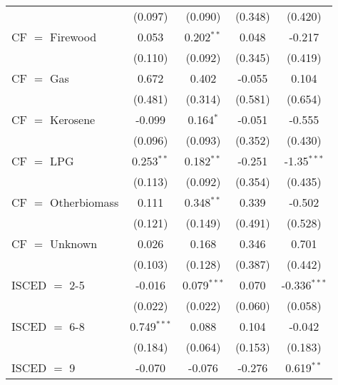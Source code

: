 \begin{table}[htbp!]
\begin{adjustbox}{width = 1\textwidth, max height = 0.95\textheight, center}
\begin{threeparttable}[b]
\begin{tabular}{lcccc}
                                 & (0.097)            & (0.090)            & (0.348)        & (0.420)\\   
            CF $=$ Firewood      & 0.053              & 0.202$^{**}$       & 0.048          & -0.217\\   
                                 & (0.110)            & (0.092)            & (0.345)        & (0.419)\\   
            CF $=$ Gas           & 0.672              & 0.402              & -0.055         & 0.104\\   
                                 & (0.481)            & (0.314)            & (0.581)        & (0.654)\\   
            CF $=$ Kerosene      & -0.099             & 0.164$^{*}$        & -0.051         & -0.555\\   
                                 & (0.096)            & (0.093)            & (0.352)        & (0.430)\\   
            CF $=$ LPG           & 0.253$^{**}$       & 0.182$^{**}$       & -0.251         & -1.35$^{***}$\\   
                                 & (0.113)            & (0.092)            & (0.354)        & (0.435)\\   
            CF $=$ Otherbiomass  & 0.111              & 0.348$^{**}$       & 0.339          & -0.502\\   
                                 & (0.121)            & (0.149)            & (0.491)        & (0.528)\\   
            CF $=$ Unknown       & 0.026              & 0.168              & 0.346          & 0.701\\   
                                 & (0.103)            & (0.128)            & (0.387)        & (0.442)\\   
            ISCED $=$ 2-5        & -0.016             & 0.079$^{***}$      & 0.070          & -0.336$^{***}$\\   
                                 & (0.022)            & (0.022)            & (0.060)        & (0.058)\\   
            ISCED $=$ 6-8        & 0.749$^{***}$      & 0.088              & 0.104          & -0.042\\   
                                 & (0.184)            & (0.064)            & (0.153)        & (0.183)\\   
            ISCED $=$ 9          & -0.070             & -0.076             & -0.276         & 0.619$^{**}$\\   

\end{tabular}
\end{threeparttable}
\end{adjustbox}
\end{table}
